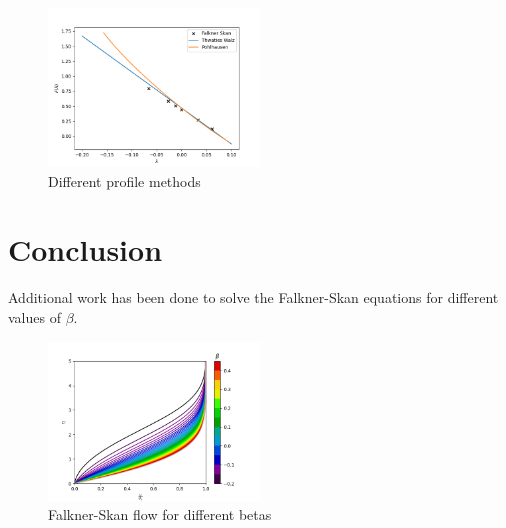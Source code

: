 \documentclass[conf]{new-aiaa}
\begin{document}
\begin{center}
    \resizebox{0.35\linewidth}{!}{}
\end{center}

\begin{figure}[H]
    \centering
    \includegraphics[width=0.5\textwidth]{Thwaites Walz.png}
    \caption{Different profile methods}
    \label{fig:multiple profiles}
\end{figure}
\section{Conclusion}

\appendix
Additional work has been done to solve the Falkner-Skan equations for different values of $\beta$. 
\begin{figure}[H]
    \centering
    \includegraphics[width=0.5\textwidth]{Continuous beta.png}
    \caption{Falkner-Skan flow for different betas}
    \label{fig:Falkner-Skan multiples betas}
\end{figure}
\end{document}
